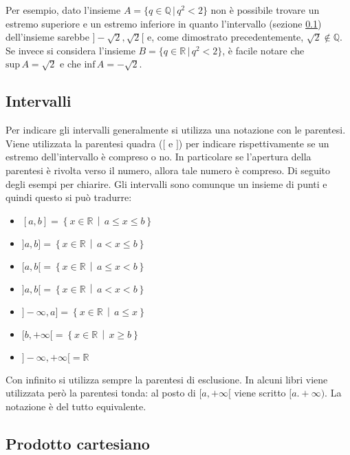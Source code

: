 Per esempio, dato l'insieme $A = \{q \in \mathbb{Q}\,|\,q^2 < 2\}$ non è 
possibile trovare un estremo superiore e un estremo inferiore in quanto 
l'intervallo (sezione \ref{sec_intervalli}) dell'insieme sarebbe $]-\sqrt{2}, 
\sqrt{2}[$ e, come dimostrato precedentemente, $\sqrt{2} \notin \mathbb{Q}$. 
Se invece si considera l'insieme $B = \{q \in \mathbb{R}\,|\,q^2 < 2\}$, è 
facile notare che $\mathrm{sup}\,A = \sqrt{2}$ e che $\mathrm{inf}\, A = 
-\sqrt{2}$.

\subsection{Intervalli} \label{sec_intervalli}
Per indicare gli intervalli generalmente si utilizza una notazione con le 
parentesi. Viene utilizzata la parentesi quadra ($[$ e $]$) per indicare 
rispettivamente se un estremo dell'intervallo è compreso o no. In particolare 
se l'apertura della parentesi è rivolta verso il numero, allora tale numero è 
compreso. Di seguito degli esempi per chiarire. Gli intervalli sono comunque 
un insieme di punti e quindi questo si può tradurre:
\begin{multicols}{2}
\begin{itemize}
    \item $[a, b] = \left\{ x \in \mathbb{R}\, \middle|\, a \leq x 	\leq 
        b\right\}$
    \item $]a, b] = \left\{ x \in \mathbb{R}\, \middle|\, a < x \leq b\right\}$
    \item $[a, b[ = \left\{ x \in \mathbb{R}\, \middle|\, a \leq x < b\right\}$
    \item $]a, b[ = \left\{ x \in \mathbb{R}\, \middle|\, a < x < b\right\}$
    
    \item $]-\infty, a] = \left\{ x \in \mathbb{R}\, \middle|\, a \leq 
        x \right\}$
    \item $[b, +\infty[ = \left\{ x \in \mathbb{R}\, \middle|\, x \geq 
        b \right\}$
    \item $]-\infty, +\infty[ = \mathbb{R}$
\end{itemize}
\end{multicols}
Con infinito si utilizza sempre la parentesi di esclusione. In alcuni libri 
viene utilizzata però la parentesi tonda: al posto di $[a,+\infty[$ viene 
scritto $[a. +\infty)$. La notazione è del tutto equivalente.

\subsection{Prodotto cartesiano}

